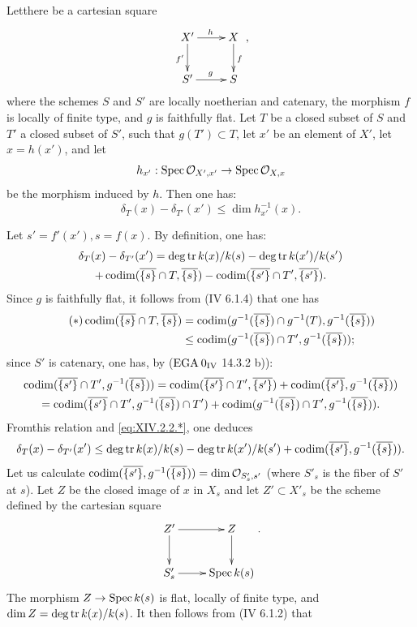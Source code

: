 \begin{sublemme} \label{XIV.2.2.1}
Let\pageoriginale there be a cartesian square
$$
\xymatrix{X'\ar[r]^{h}\ar[d]_{f'}&X\ar[d]^f\\S'\ar[r]^g&S},
$$
where the schemes $S$ and $S'$ are locally noetherian and catenary, the morphism $f$ is locally of finite type, and $g$ is faithfully flat. Let $T$ be a closed subset of $S$ and $T'$ a closed subset of $S'$, such that $g(T')\subset T$, let $x'$ be an element of $X'$, let $x=h(x')$, and let
$$h_{x'}:\operatorname{Spec}\mathcal O_{X', x'}\to\operatorname{Spec}\mathcal O_{X, x}$$
be the morphism induced by $h$. Then one has:
$$
\delta_T(x)-\delta_{T'}(x')\leq\dim h_{x'}^{-1}(x).
$$
\end{sublemme}

Let $s'=f'(x'), s=f(x)$. By definition, one has:
\begin{multline*}
\delta_T(x)-\delta_{T'}(x')=\operatorname{deg\,tr} k(x)/k(s)-\operatorname{deg\,tr} k(x')/k(s')\\
+\operatorname{codim}(\overline{\{s\}}\cap T, \overline{\{s\}})-\operatorname{codim}(\overline{\{s'\}}\cap T', \overline{\{s'\}}).
\end{multline*}
Since $g$ is faithfully flat, it follows from (\EGA IV 6.1.4) that one has
\begin{align*} \label{eq:XIV.2.2.*} \tag{$*$}
\operatorname{codim}(\overline{\{s\}}\cap T, \overline{\{s\}})&=\operatorname{codim}(g^{-1}(\overline{\{s\}})\cap g^{-1}(T), g^{-1}(\overline{\{s\}}))\\&\leq\operatorname{codim}(g^{-1}(\overline{\{s\}})\cap T', g^{-1}(\overline{\{s\}}));
\end{align*}
since $S'$ is catenary, one has, by ($\textup{EGA}\kern.2em 0_{\textup{IV}}$ 14.3.2 b)):
\begin{multline*}
\operatorname{codim}(\overline{\{s'\}}\cap T', g^{-1}(\overline{\{s\}}))= \operatorname{codim}(\overline{\{s'\}}\cap T', \overline{\{s'\}})+ \operatorname{codim}(\overline{\{s'\}}, g^{-1}(\overline{\{s\}}))\\
= \operatorname{codim}(\overline{\{s'\}}\cap T', g^{-1}(\overline{\{s\}})\cap T')+ \operatorname{codim}(g^{-1}(\overline{\{s\}})\cap T', g^{-1}(\overline{\{s\}})).
\end{multline*}
From\pageoriginale this relation and \eqref{eq:XIV.2.2.*}, one deduces
$$
\delta_T(x)-\delta_{T'}(x')\leq\operatorname{deg\,tr} k(x)/k(s)-\operatorname{deg\,tr} k(x')/k(s')+\operatorname{codim}(\overline{\{s'\}}, g^{-1}(\overline{\{s\}})).
$$
Let us calculate $\operatorname{codim}(\overline{\{s'\}}, g^{-1}(\overline{\{s\}}))=\dim\mathcal O_{S'_s, s'}$ (where $S'_s$ is the fiber of $S'$ at $s$). Let $Z$ be the closed image of $x$ in $X_s$ and let $Z'\subset X'_s$ be the scheme defined by the cartesian square
$$
\xymatrix{Z'\ar[r]\ar[d]&Z\ar[d]\\S'_s\ar[r]&\Spec k(s)}.
$$
The morphism $Z\to \operatorname{Spec} k(s)$ is flat, locally of finite type, and $\dim Z=\operatorname{deg\,tr} k(x)/k(s)$. It then follows from (\EGA IV 6.1.2) that


